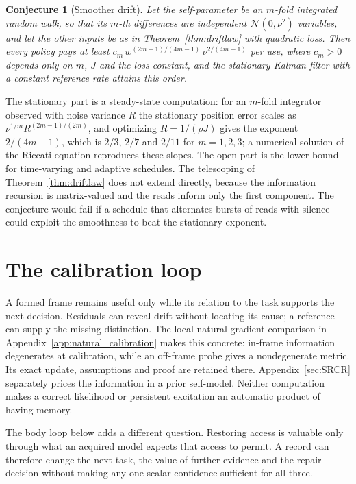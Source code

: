 \documentclass[12pt]{article}
\newtheorem{conjecture}[theorem]{Conjecture}
\theoremstyle{definition}
\begin{document}
\begin{conjecture}[Smoother drift]
\label{conj:smooth}
Let the self-parameter be an $m$-fold integrated random walk, so that its $m$-th differences are independent $\mathcal N(0,\nu^2)$ variables, and let the other inputs be as in Theorem~\ref{thm:driftlaw} with quadratic loss. Then every policy pays at least $c_m\,w^{(2m-1)/(4m-1)}\,\nu^{2/(4m-1)}$ per use, where $c_m>0$ depends only on $m$, $J$ and the loss constant, and the stationary Kalman filter with a constant reference rate attains this order.
\end{conjecture}

The stationary part is a steady-state computation: for an $m$-fold integrator observed with noise variance $R$ the stationary position error scales as $\nu^{1/m}R^{(2m-1)/(2m)}$, and optimizing $R=1/(\rho J)$ gives the exponent $2/(4m-1)$, which is $2/3$, $2/7$ and $2/11$ for $m=1,2,3$; a numerical solution of the Riccati equation reproduces these slopes. The open part is the lower bound for time-varying and adaptive schedules. The telescoping of Theorem~\ref{thm:driftlaw} does not extend directly, because the information recursion is matrix-valued and the reads inform only the first component. The conjecture would fail if a schedule that alternates bursts of reads with silence could exploit the smoothness to beat the stationary exponent.

\section{The calibration loop}
\label{sec:loop}

A formed frame remains useful only while its relation to the task
supports the next decision. Residuals can reveal drift without locating
its cause; a reference can supply the missing distinction.
The local natural-gradient comparison in
Appendix~\ref{app:natural_calibration} makes this concrete:
in-frame information degenerates at calibration, while an off-frame
probe gives a nondegenerate metric. Its exact update, assumptions
and proof are retained there. Appendix~\ref{sec:SRCR} separately prices
the information in a prior self-model.
Neither computation makes a correct likelihood or persistent
excitation an automatic product of having memory.

The body loop below adds a different question. Restoring access is
valuable only through what an acquired model expects that access to
permit. A record can therefore change the next task, the value of
further evidence and the repair decision without making any one
scalar confidence sufficient for all three.
\end{document}
